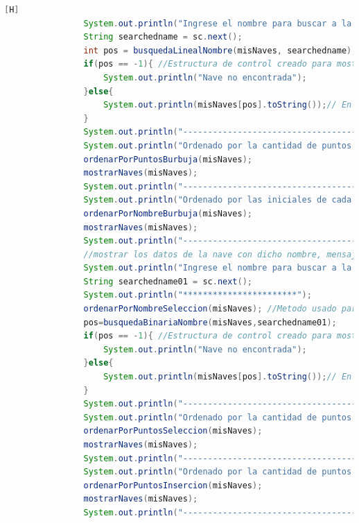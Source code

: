 \documentclass{article}
\begin{document}
\begin{lstlisting}[language=java,caption={Las lineas de codigo de lo creado:}][H]
				System.out.println("Ingrese el nombre para buscar a la primera nave: ");
				String searchedname = sc.next();
				int pos = busquedaLinealNombre(misNaves, searchedname);
				if(pos == -1){ //Estructura de control creado para mostrar el mensaje de "Nave no encontrada" debido a que esta comparando con los demas nombres de las otras naves
					System.out.println("Nave no encontrada");
				}else{
					System.out.println(misNaves[pos].toString());// En caso de encontrarlo imprimira sus datos de esta nave en caso de no dara mensaja de (Nave no encontrada)
				}
				System.out.println("--------------------------------------");
				System.out.println("Ordenado por la cantidad de puntos del menor al mayor mediante el metodo burbuja: ");
				ordenarPorPuntosBurbuja(misNaves);
				mostrarNaves(misNaves);
				System.out.println("--------------------------------------");
				System.out.println("Ordenado por las iniciales de cada nombre de A a la Z mediante el metodo burbuja: ");
				ordenarPorNombreBurbuja(misNaves);
				mostrarNaves(misNaves);
				System.out.println("--------------------------------------");
				//mostrar los datos de la nave con dicho nombre, mensaje de “no encontrado” en caso contrario
				System.out.println("Ingrese el nombre para buscar a la nave: ");
				String searchedname01 = sc.next();
				System.out.println("***********************");
				ordenarPorNombreSeleccion(misNaves); //Metodo usado para poder ordenar las palabras y asi que esta pueda ser buscada por la busqueda binaria ya para que esta sirva todos los nombres deben estar ordenados de la A hasta la Z 
				pos=busquedaBinariaNombre(misNaves,searchedname01);
				if(pos == -1){ //Estructura de control creado para mostrar el mensaje de "Nave no encontrada" debido a que esta buscando y comparando con los demas nombres de las otras naves
					System.out.println("Nave no encontrada");
				}else{
					System.out.println(misNaves[pos].toString());// En caso de encontrarlo imprimira sus datos de esta nave en caso de no dara mensaja de (Nave no encontrada)
				}
				System.out.println("--------------------------------------");
				System.out.println("Ordenado por la cantidad de puntos del menor al mayor mediante el metodo seleccion: ");
				ordenarPorPuntosSeleccion(misNaves);
				mostrarNaves(misNaves);
				System.out.println("--------------------------------------");
				System.out.println("Ordenado por la cantidad de puntos del mayor al menor mediante el metodo insercion: ");
				ordenarPorPuntosInsercion(misNaves);
				mostrarNaves(misNaves);
				System.out.println("--------------------------------------");

\end{lstlisting}
\end{document}
